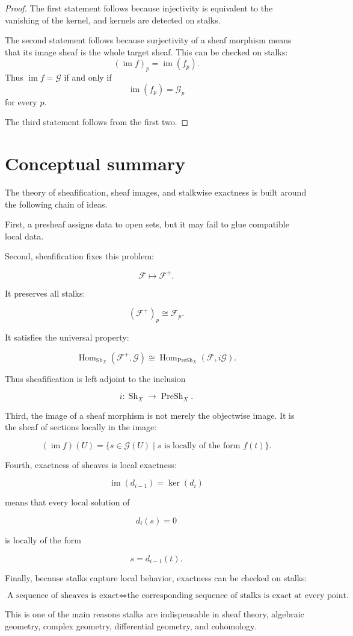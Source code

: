 \documentclass[12pt,a4paper]{article}
\newcommand{\PreSh}{\operatorname{PreSh}}
\newcommand{\Sh}{\operatorname{Sh}}
\newcommand{\Hom}{\operatorname{Hom}}
\newcommand{\im}{\operatorname{im}}
\begin{document}
\begin{proof}
	The first statement follows because injectivity is equivalent to the vanishing
	of the kernel, and kernels are detected on stalks.
	
	The second statement follows because surjectivity of a sheaf morphism means
	that its image sheaf is the whole target sheaf.
	This can be checked on stalks:
	\[
	(\im f)_p=\im(f_p).
	\]
	Thus $\im f=\mathcal G$ if and only if
	\[
	\im(f_p)=\mathcal G_p
	\]
	for every $p$.
	
	The third statement follows from the first two.
\end{proof}

\section{Conceptual summary}

The theory of sheafification, sheaf images, and stalkwise exactness is built
around the following chain of ideas.

First, a presheaf assigns data to open sets, but it may fail to glue compatible
local data.

Second, sheafification fixes this problem:

\[
\mathcal F \longmapsto \mathcal F^+.
\]

It preserves all stalks:

\[
(\mathcal F^+)_p\cong \mathcal F_p.
\]

It satisfies the universal property:

\[
\Hom_{\Sh_X}(\mathcal F^+,\mathcal G)
\cong
\Hom_{\PreSh_X}(\mathcal F,i\mathcal G).
\]

Thus sheafification is left adjoint to the inclusion

\[
i:\Sh_X\to\PreSh_X.
\]

Third, the image of a sheaf morphism is not merely the objectwise image.
It is the sheaf of sections locally in the image:

\[
(\im f)(U)
=
\{s\in\mathcal G(U)
\mid
s \text{ is locally of the form } f(t)\}.
\]

Fourth, exactness of sheaves is local exactness:

\[
\im(d_{i-1})=\ker(d_i)
\]

means that every local solution of

\[
d_i(s)=0
\]

is locally of the form

\[
s=d_{i-1}(t).
\]

Finally, because stalks capture local behavior, exactness can be checked on
stalks:

\[
\boxed{
	\text{A sequence of sheaves is exact}
	\iff
	\text{the corresponding sequence of stalks is exact at every point.}
}
\]

This is one of the main reasons stalks are indispensable in sheaf theory,
algebraic geometry, complex geometry, differential geometry, and cohomology.
	
\end{document}
